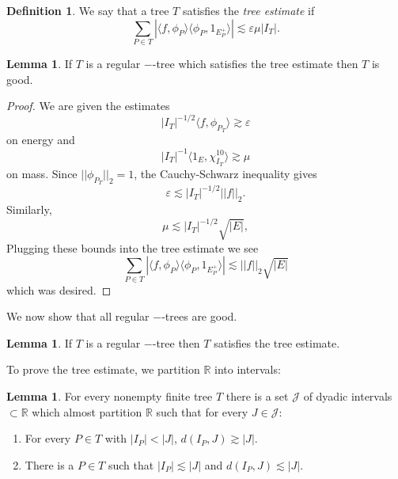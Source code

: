 \documentclass[12pt]{report}
\newcommand{\RR}{\mathbb{R}}
\newcommand{\dfn}[1]{\emph{#1}\index{#1}}
\theoremstyle{definition}
\newtheorem{lemma}[theorem]{Lemma}
\newtheorem{definition}[theorem]{Definition}
\begin{document}
\begin{definition}
We say that a tree $T$ satisfies the \dfn{tree estimate} if
$$\sum_{P \in T} |\langle f, \phi_P\rangle\langle\phi_P,1_{E_P^+}\rangle| \lesssim \varepsilon\mu|I_T|.$$
\end{definition}
\begin{lemma}
If $T$ is a regular $-$-tree which satisfies the tree estimate then $T$ is good.
\end{lemma}
\begin{proof}
We are given the estimates
$$|I_T|^{-1/2}\langle f, \phi_{P_T}\rangle \gtrsim \varepsilon$$
on energy and
$$|I_T|^{-1}\langle 1_E, \chi_{I_T}^{10}\rangle \gtrsim \mu$$
on mass. Since $||\phi_{P_T}||_2 = 1$, the Cauchy-Schwarz inequality gives
$$\varepsilon \lesssim |I_T|^{-1/2}||f||_2.$$
Similarly,
$$\mu \lesssim |I_T|^{-1/2}\sqrt{|E|},$$
Plugging these bounds into the tree estimate we see
$$\sum_{P \in T} |\langle f, \phi_P\rangle\langle\phi_P,1_{E_P^+}\rangle| \lesssim ||f||_2 \sqrt{|E|}$$
which was desired.
\end{proof}
We now show that all regular $-$-trees are good.
\begin{lemma}
If $T$ is a regular $-$-tree then $T$ satisfies the tree estimate.
\end{lemma}
To prove the tree estimate, we partition $\RR$ into intervals:
\begin{lemma}
For every nonempty finite tree $T$ there is a set $\mathcal J$ of dyadic intervals $\subset \RR$ which almost partition $\RR$ such that for every $J \in \mathcal J$:
\begin{enumerate}
\item For every $P \in T$ with $|I_P| < |J|$, $d(I_P, J) \gtrsim |J|$.
\item There is a $P \in T$ such that $|I_P| \lesssim |J|$ and $d(I_P, J) \lesssim |J|$.
\end{enumerate}
\end{lemma}
\end{document}

